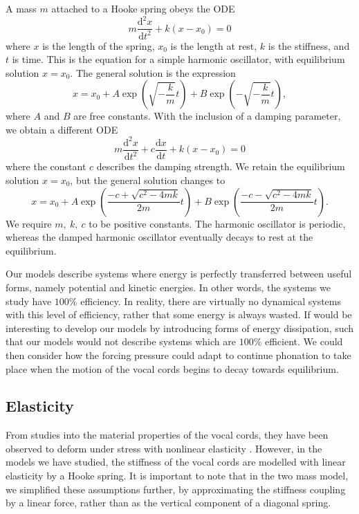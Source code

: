\documentclass{report}
\begin{document}
A mass $m$ attached to a Hooke spring obeys the ODE
\begin{equation*}
	m\frac{\mathrm{d}^2 x}{\mathrm{d}t^2} + k(x-x_0) = 0
\end{equation*}
where $x$ is the length of the spring, $x_0$ is the length at rest,
$k$ is the stiffness,
and $t$ is time.
This is the equation for a simple harmonic oscillator,
with equilibrium solution $x=x_0$.
The general solution is the expression
\begin{equation*}
	x = x_0 + A\exp \left(
		\sqrt{-\frac{k}{m}}t
	\right) + B\exp \left(
		-\sqrt{-\frac{k}{m}}t
	\right),
\end{equation*}
where $A$ and $B$ are free constants.
With the inclusion of a damping parameter,
we obtain a different ODE
\begin{equation*}
	m\frac{\mathrm{d}^2 x}{\mathrm{d}t^2} + c\frac{\mathrm{d}x}{\mathrm{d}t} + k(x-x_0) = 0
\end{equation*}
where the constant $c$ describes the damping strength.
We retain the equilibrium solution $x=x_0$, but the general solution changes to
\begin{equation*}
	x = x_0 + A \exp \left(
		\frac{-c+\sqrt{c^2-4mk}}{2m}t
	\right) + B \exp \left(
		\frac{-c-\sqrt{c^2-4mk}}{2m}t
	\right).
\end{equation*}
We require $m,~k,~c$ to be positive constants.
The harmonic oscillator is periodic,
whereas the damped harmonic oscillator eventually decays to rest at the equilibrium.

Our models describe systems where energy is perfectly transferred between useful forms,
namely potential and kinetic energies.
In other words, the systems we study have $100\%$ efficiency.
In reality, there are virtually no dynamical systems with this level of efficiency,
rather that some energy is always wasted.
If would be interesting to develop our models by introducing forms of energy dissipation,
such that our models would not describe systems which are $100\%$ efficient.
We could then consider how the forcing pressure could adapt to continue phonation to take place when the motion of the vocal cords begins to decay towards equilibrium.


\subsection{Elasticity}

From studies into the material properties of the vocal cords,
they have been observed to deform under stress with nonlinear elasticity \cite{alipour_2012}.
However, in the models we have studied,
the stiffness of the vocal cords are modelled with linear elasticity by a Hooke spring.
It is important to note that in the two mass model,
we simplified these assumptions further,
by approximating the stiffness coupling by a linear force,
rather than as the vertical component of a diagonal spring.
\end{document}
